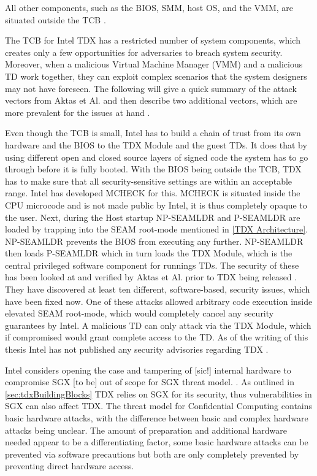 All other components, such as the BIOS, SMM, host OS, and the VMM, are situated outside the TCB \cite{noauthor_tdx-whitepaper-february2022pdf_nodate}.


The TCB for Intel TDX has a restricted number of system components, which creates only a few opportunities for adversaries to breach system security. Moreover, when a malicious Virtual Machine Manager (VMM) and a malicious TD work together, they can exploit complex scenarios that the system designers may not have foreseen. The following will give a quick summary of the attack vectors from Aktas et Al. and then describe two additional vectors, which are more prevalent for the issues at hand \cite{aktas_intel_nodate}.


Even though the TCB is small, Intel has to build a chain of trust from its own hardware and the BIOS to the TDX Module and the guest TDs. It does that by using different open and closed source layers of signed code the system has to go through before it is fully booted. With the BIOS being outside the TCB, TDX has to make sure that all security-sensitive settings are within an acceptable range. Intel has developed MCHECK for this. MCHECK is situated inside the CPU microcode and is not made public by Intel, it is thus completely opaque to the user. Next, during the Host startup NP-SEAMLDR and P-SEAMLDR are loaded by trapping into the SEAM root-mode mentioned in \cref{TDX Architecture}. NP-SEAMLDR prevents the BIOS from executing any further. NP-SEAMLDR then loads P-SEAMLDR which in turn loads the TDX Module, which is the central privileged software component for runnings TDs. The security of these has been looked at and verified by Aktas et Al. prior to TDX being released \cite{aktas_intel_nodate}. They have discovered at least ten different, software-based, security issues, which have been fixed now. One of these attacks allowed arbitrary code execution inside elevated SEAM root-mode, which would completely cancel any security guarantees by Intel. A malicious TD can only attack via the TDX Module, which if compromised would grant complete access to the TD. As of the writing of this thesis Intel has not published any security advisories regarding TDX \cite{security_advisories}.


Intel considers \guillemotright opening the case and tampering of [sic!] internal hardware to compromise \Gls{SGX} [to be] out of scope for \Gls{SGX} threat model. \guillemotleft \cite{chen_voltpillager_nodate}. As outlined in \cref{sec:tdxBuildingBlocks} TDX relies on \Gls{SGX} for its security, thus vulnerabilities in \Gls{SGX} can also affect TDX. The threat model for Confidential Computing contains basic hardware attacks, with the difference between basic and complex hardware attacks being unclear. The amount of preparation and additional hardware needed appear to be a differentiating factor, some basic hardware attacks can be prevented via software precautions but both are only completely prevented by preventing direct hardware access. 

